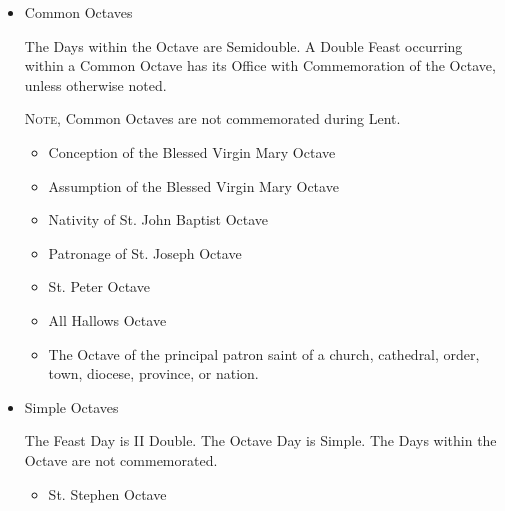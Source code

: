\begin{itemize}
\begin{itemize}
            \item Common Octaves\par
            The Days within the Octave are Semidouble. A Double Feast occurring within a Common Octave has its Office with Commemoration of the Octave, unless otherwise noted.\par
            \textsc{Note,} Common Octaves are not commemorated during Lent.
                \begin{itemize}
                    \item Conception of the Blessed Virgin Mary Octave
                    \item Assumption of the Blessed Virgin Mary Octave
                    \item Nativity of St. John Baptist Octave
                    \item Patronage of St. Joseph Octave
                    \item St. Peter Octave
                    \item All Hallows Octave
                    \item The Octave of the principal patron saint of a church, cathedral, order, town, diocese, province, or nation. 
                \end{itemize}
            \item Simple Octaves\par
            The Feast Day is II Double. The Octave Day is Simple. The Days within the Octave are not commemorated.
                \begin{itemize}
                    \item St. Stephen Octave

\end{itemize}
\end{itemize}
\end{itemize}
